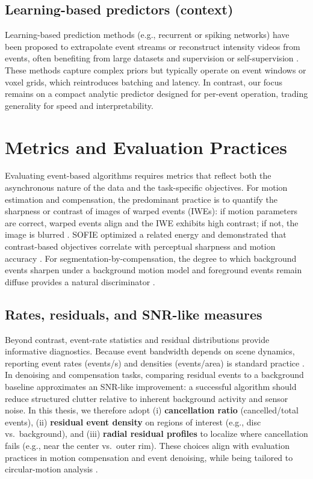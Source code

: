 \subsection{Learning-based predictors (context)}
Learning-based prediction methods (e.g., recurrent or spiking networks) have been proposed to extrapolate event streams or reconstruct intensity videos from events, often benefiting from large datasets and supervision or self-supervision \cite{Rebecq2019,Gallego2020Survey}. These methods capture complex priors but typically operate on event windows or voxel grids, which reintroduces batching and latency. In contrast, our focus remains on a compact analytic predictor designed for per-event operation, trading generality for speed and interpretability.

\section{Metrics and Evaluation Practices}
\label{sec:metrics-eval}

Evaluating event-based algorithms requires metrics that reflect both the asynchronous nature of the data and the task-specific objectives. For motion estimation and compensation, the predominant practice is to quantify the sharpness or contrast of images of warped events (IWEs): if motion parameters are correct, warped events align and the IWE exhibits high contrast; if not, the image is blurred \cite{Gallego2018CMax}. SOFIE optimized a related energy and demonstrated that contrast-based objectives correlate with perceptual sharpness and motion accuracy \cite{Bardow2016SOFIE}. For segmentation-by-compensation, the degree to which background events sharpen under a background motion model and foreground events remain diffuse provides a natural discriminator \cite{Stoffregen2019Segmentation}.

\subsection{Rates, residuals, and SNR-like measures}
Beyond contrast, event-rate statistics and residual distributions provide informative diagnostics. Because event bandwidth depends on scene dynamics, reporting event rates (events/s) and densities (events/area) is standard practice \cite{Gallego2020Survey}. In denoising and compensation tasks, comparing residual events to a background baseline approximates an SNR-like improvement: a successful algorithm should reduce structured clutter relative to inherent background activity and sensor noise. In this thesis, we therefore adopt (i) \textbf{cancellation ratio} (cancelled/total events), (ii) \textbf{residual event density} on regions of interest (e.g., disc vs.\ background), and (iii) \textbf{radial residual profiles} to localize where cancellation fails (e.g., near the center vs.\ outer rim). These choices align with evaluation practices in motion compensation and event denoising, while being tailored to circular-motion analysis \cite{Bardow2016SOFIE,Gallego2018CMax,Xu2020}.

